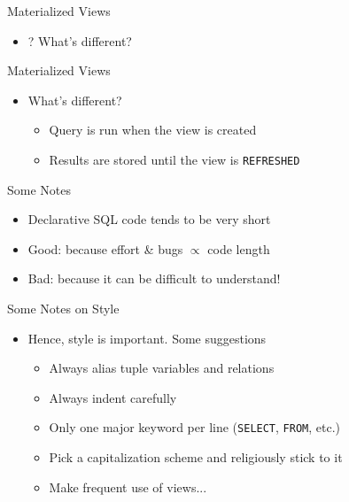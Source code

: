 \documentclass[aspectratio=169]{beamer}
\newenvironment{noindentitemize}
{ \begin{itemize}
 \setlength{\itemsep}{1.5ex}
  \setlength{\parsep}{0pt}   
  \setlength{\parskip}{0pt}
 \addtolength{\leftskip}{-2em}
 }
{ \end{itemize} }
\newenvironment{noindentitemize2}
{ \begin{itemize}
  \setlength{\itemsep}{0ex}
  \setlength{\parskip}{0pt}
  \setlength{\parsep}{0pt}   
  \addtolength{\leftskip}{-2em}  }
{ \end{itemize} }
\begin{document}
\begin{frame}[fragile]{Materialized Views}

\begin{noindentitemize}
\item[?] What's different?
\end{noindentitemize}
\end{frame}
\begin{frame}[fragile]{Materialized Views}

\begin{noindentitemize}
\item What's different?
\begin{noindentitemize2}
\item Query is run when the view is created
\item Results are stored until the view is \texttt{REFRESHED}
\end{noindentitemize2}
\end{noindentitemize}

\end{frame}


\begin{frame}{Some Notes}

\begin{itemize}
	\item Declarative SQL code tends to be very short
	\item Good: because effort \& bugs $\propto$ code length
	\item Bad: because it can be difficult to understand!
\end{itemize}
\end{frame}

\begin{frame}{Some Notes on Style}

\begin{itemize}
\item Hence, style is important.  Some suggestions
	\begin{itemize}
	\item Always alias tuple variables and relations
	\item Always indent carefully
	\item Only one major keyword per line (\texttt{SELECT}, \texttt{FROM}, etc.)
	\item Pick a capitalization scheme and religiously stick to it
	\item Make frequent use of views...
	\end{itemize}
\end{itemize}
\end{frame}
\end{document}
